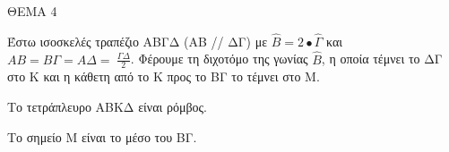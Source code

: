 
ΘΕΜΑ 4

Έστω ισοσκελές τραπέζιο ΑΒΓΔ (ΑΒ // ΔΓ) με $\widehat{Β} = 2 \bullet \widehat{\Gamma}$ και $ΑΒ = Β\Gamma = Α\Delta = \ \frac{\Gamma\Delta}{2}$. Φέρουμε τη διχοτόμο της γωνίας $\widehat{Β}$, η οποία τέμνει το ΔΓ στο Κ και η κάθετη από το Κ προς το ΒΓ το τέμνει στο Μ.

\begin{alist}
\item Να υπολογίσετε τις γωνίες του ΑΒΓΔ. 

\item Να αποδείξετε ότι:

.}
\end{alist}
\begin{alist}
\item
  Το τετράπλευρο ΑΒΚΔ είναι ρόμβος. 
\item
  Το σημείο Μ είναι το μέσο του ΒΓ. 


\end{alist}

